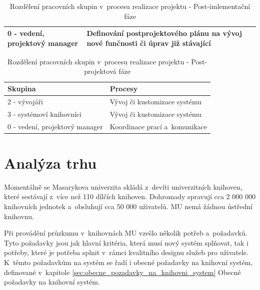 \documentclass[
	11pt, oneside, printed, final, palatino, monochrome
	microtype,
	table,   %
	lof,     %
	lot     %
]{fithesis3}
\newcommand{\bold}[1]{\textbf{#1}}
\begin{document}
{\begin{table}
\begin{tabular}{| p{3cm} | p{8.3cm} |}
	0 - vedení, projektový manager
    & 
    Definování postprojektového plánu na vývoj nové funčnosti či úprav již stávající
    \\ \hline
    
    \end{tabular}
    \caption{Rozdělení pracovních skupin v~procesu realizace projektu - Post-imlementační fáze}
\end{table}

\begin{table}
    \centering
    \begin{tabular}{| p{3cm} | p{8.3cm} |}
    \hline
    \bold{Skupina} 	
    & 
    \bold{Procesy} 
    \\ \hline
    
	2 - vývojáři
    & 
	Vývoj či kustomizace systému
    \\ \hline
    
	3 - systémoví knihovníci
    & 
    Vývoj či kustomizace systému
    \\ \hline
    
	0 - vedení, projektový manager
    & 
    Koordinace prací a~komunikace
    \\ \hline
    
    \end{tabular}
    \caption{Rozdělení pracovních skupin v~procesu realizace projektu - Post-projektová fáze}
\end{table}

\section{Analýza trhu}
Momentálně se Masarykova univerzita skládá z~devíti univerzitních knihoven, které sestávají z~více než 110 dílčích knihoven. Dohromady spravují cca 2 000 000 knihovních jednotek a~obsluhují cca 50 000 uživatelů. MU nemá žádnou ústřední knihovnu.

Při provádění průzkumu v~knihovnách MU vzešlo několik potřeb a~požadavků. Tyto požadavky jsou jak hlavní kritéria, která musí nový systém splňovat, tak i potřeby, které je potřeba splnit v~rámci kvalitního designu služeb pro uživatele. K~těmto požadavkům na systém se řadí i obecné požadavky na knihovní systém, definované v~kapitole \ref{sec:obecne_pozadavky_na_knihovni_system} Obecné požadavky na knihovní systém.

}
\end{document}
